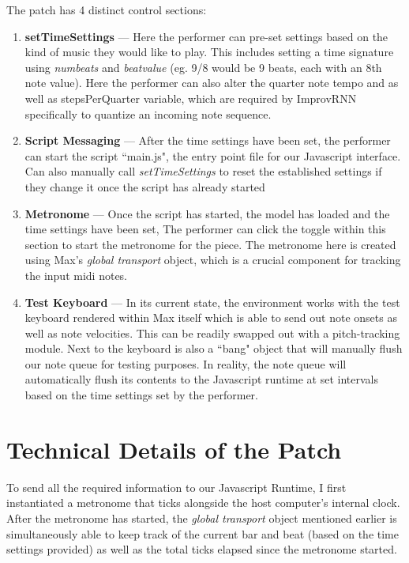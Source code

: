 \documentclass[../main.tex]{subfiles}
\begin{document}
The patch has 4 distinct control sections:

\begin{enumerate}
    \item \textbf{setTimeSettings} — Here the performer can pre-set settings based on the kind of music they would like to play. This includes setting a time signature using \textit{numbeats} and  \textit{beatvalue} (eg. 9/8 would be 9 beats, each with an 8th note value). Here the performer can also alter the quarter note tempo and as well as stepsPerQuarter variable, which are required by ImprovRNN specifically to quantize an incoming note sequence. 

     \item \textbf{Script Messaging} — After the time settings have been set, the performer can start the script ``main.js", the entry point file for our Javascript interface. Can also manually call \textit{setTimeSettings} to reset the established settings if they change it once the script has already started

    \item \textbf{Metronome} — Once the script has started, the model has loaded and the time settings have been set, The performer can click the toggle within this section to start the metronome for the piece. The metronome here is created using Max's \textit{global transport} object, which is a crucial component for tracking the input midi notes.

    \item \textbf{Test Keyboard} — In its current state, the environment works with the test keyboard rendered within Max itself which is able to send out note onsets as well as note velocities. This can be readily swapped out with a pitch-tracking module. Next to the keyboard is also a ``bang" object that will manually flush our note queue for testing purposes. In reality, the note queue will automatically flush its contents to the Javascript runtime at set intervals based on the time settings set by the performer.
\end{enumerate}

\section{Technical Details of the Patch}
To send all the required information to our Javascript Runtime, I first instantiated a metronome that ticks alongside the host computer's internal clock. After the metronome has started, the \textit{global transport} object mentioned earlier is simultaneously able to keep track of the current bar and beat (based on the time settings provided) as well as the total ticks elapsed since the metronome started. 
\end{document}
